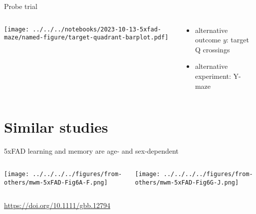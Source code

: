 \documentclass[aspectratio=169]{beamer}
\begin{document}
\begin{frame}{Probe trial}
\begin{columns}[t]
\begin{column}{0.5\textwidth}

\texttt{[image: ../../../notebooks/2023-10-13-5xfad-maze/named-figure/target-quadrant-barplot.pdf]}
\end{column}

\begin{column}{0.5\textwidth}

\begin{itemize}
  \item alternative outcome $y$: target Q crossings
  \item alternative experiment: Y-maze
\end{itemize}
\end{column}
\end{columns}
\end{frame}

\section{Similar studies}

\begin{frame}{5xFAD learning and memory are age- and sex-dependent}
\begin{columns}[t]
\begin{column}{0.5\textwidth}

\texttt{[image: ../../../../figures/from-others/mwm-5xFAD-Fig6A-F.png]}
\end{column}

\begin{column}{0.5\textwidth}

\texttt{[image: ../../../../figures/from-others/mwm-5xFAD-Fig6G-J.png]}
\end{column}
\end{columns}
\begin{center}
\tiny \url{https://doi.org/10.1111/gbb.12794}
\end{center}
\end{frame}
\end{document}
